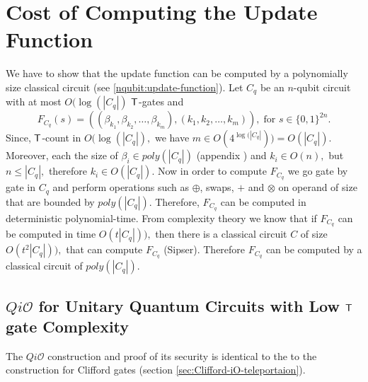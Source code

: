 \section*{Cost of Computing the Update Function}
We have to show that the update function can be computed by a polynomially size classical circuit (see \ref{nqubit:update-function}). Let $C_q $ be an $n$-qubit circuit with at most $O(\log(|C_q|)$ ${\sf T}$-gates and 
                                                                                        $$F_{C_q}(s)=((\beta_{k_1}, \beta_{k_2},\ldots, \beta_{k_m}),(k_1,k_2,\ldots, k_m)),\; \mbox{for } s\in\{0,1\}^{2n}.$$
Since, ${\sf T}$-count in $O(\log(|C_q|),$ we have $m\in O(4^{\log(|C_q|}))= O(|C_q|).$ Moreover, each the size of $\beta_i \in poly(|C_q|)$ (appendix ) and $k_i \in O(n),$ but $n\leq |C_q|,$ therefore  $k_i \in O(|C_q|).$ Now in order to compute $F_{C_q}$ we go gate by gate in $C_q$ and perform operations such as $\oplus$, swaps, $+$ and $\otimes$ on operand of size that are bounded by $poly(|C_q|).$ Therefore, $F_{C_q}$ can be computed in deterministic polynomial-time. From complexity theory we know that
if $F_{C_q}$ can be computed in time $O(t|C_q|)),$ then there is a classical circuit $C$ of size $O(t^2|C_q|)),$ that can compute $F_{C_q}$ \cite{Sipser 3rd edition, page 407} (Sipser). Therefore $F_{C_q}$ can be computed by a classical circuit of $poly(|C_q|).$

\subsection{$Qi\mathcal{O}$ for Unitary Quantum Circuits with Low ${\sf T}$ gate Complexity}
The $Qi\mathcal{O}$ construction and proof of its security is identical to the to the construction for Clifford gates (section \ref{sec:Clifford-iO-teleportaion}).



